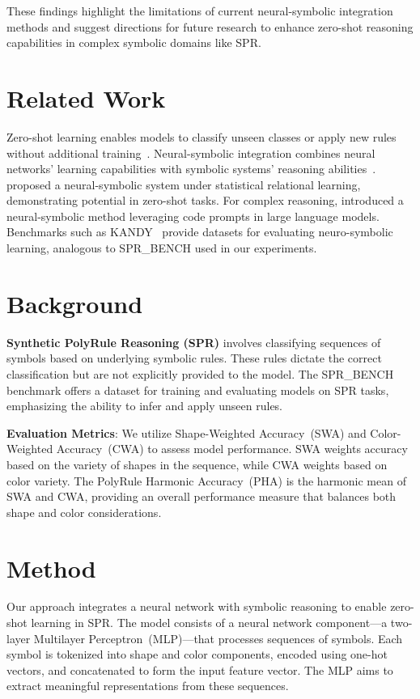 \documentclass{article} %
\begin{document}
These findings highlight the limitations of current neural-symbolic integration methods and suggest directions for future research to enhance zero-shot reasoning capabilities in complex symbolic domains like SPR.

\section{Related Work}
\label{sec:related}

Zero-shot learning enables models to classify unseen classes or apply new rules without additional training~\cite{pradhan2020unseenlc}. Neural-symbolic integration combines neural networks' learning capabilities with symbolic systems' reasoning abilities~\cite{tsamoura2020neuralsymbolicia}. \citet{yu2023ann} proposed a neural-symbolic system under statistical relational learning, demonstrating potential in zero-shot tasks. For complex reasoning, \citet{hu2023codepa} introduced a neural-symbolic method leveraging code prompts in large language models. Benchmarks such as KANDY~\cite{lorello2024thekb} provide datasets for evaluating neuro-symbolic learning, analogous to SPR\_BENCH used in our experiments.

\section{Background}
\label{sec:background}

\textbf{Synthetic PolyRule Reasoning (SPR)} involves classifying sequences of symbols based on underlying symbolic rules. These rules dictate the correct classification but are not explicitly provided to the model. The SPR\_BENCH benchmark offers a dataset for training and evaluating models on SPR tasks, emphasizing the ability to infer and apply unseen rules.

\textbf{Evaluation Metrics}: We utilize Shape-Weighted Accuracy~(SWA) and Color-Weighted Accuracy~(CWA) to assess model performance. SWA weights accuracy based on the variety of shapes in the sequence, while CWA weights based on color variety. The PolyRule Harmonic Accuracy~(PHA) is the harmonic mean of SWA and CWA, providing an overall performance measure that balances both shape and color considerations.

\section{Method}
\label{sec:method}

Our approach integrates a neural network with symbolic reasoning to enable zero-shot learning in SPR. The model consists of a neural network component—a two-layer Multilayer Perceptron~(MLP)—that processes sequences of symbols. Each symbol is tokenized into shape and color components, encoded using one-hot vectors, and concatenated to form the input feature vector. The MLP aims to extract meaningful representations from these sequences.
\end{document}
